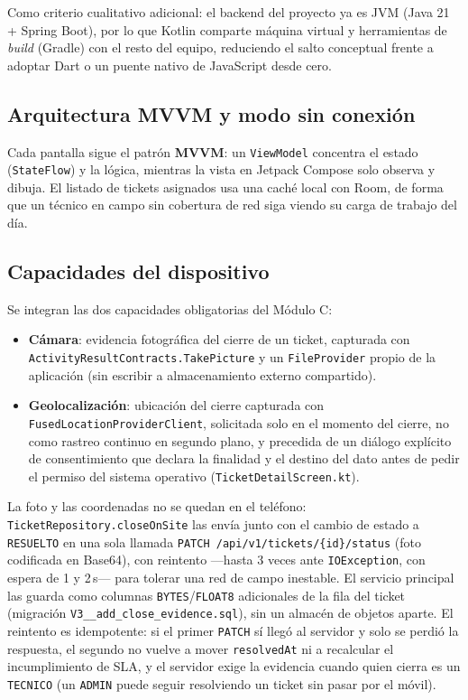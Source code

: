 Como criterio cualitativo adicional: el backend del proyecto ya es JVM (Java 21 + Spring Boot),
por lo que Kotlin comparte máquina virtual y herramientas de \emph{build} (Gradle) con el resto
del equipo, reduciendo el salto conceptual frente a adoptar Dart o un puente nativo de JavaScript
desde cero.

\subsection{Arquitectura MVVM y modo sin conexión}

Cada pantalla sigue el patrón \textbf{MVVM}: un \texttt{ViewModel} concentra el estado
(\texttt{StateFlow}) y la lógica, mientras la vista en Jetpack Compose solo observa y dibuja. El
listado de tickets asignados usa una caché local con Room, de forma que un técnico en campo sin
cobertura de red siga viendo su carga de trabajo del día.

\subsection{Capacidades del dispositivo}

Se integran las dos capacidades obligatorias del Módulo C:

\begin{itemize}[nosep]
  \item \textbf{Cámara}: evidencia fotográfica del cierre de un ticket, capturada con
        \texttt{ActivityResultContracts.TakePicture} y un \texttt{FileProvider} propio de la
        aplicación (sin escribir a almacenamiento externo compartido).
  \item \textbf{Geolocalización}: ubicación del cierre capturada con
        \texttt{FusedLocationProviderClient}, solicitada solo en el momento del cierre, no como
        rastreo continuo en segundo plano, y precedida de un diálogo explícito de consentimiento
        que declara la finalidad y el destino del dato antes de pedir el permiso del sistema
        operativo (\texttt{TicketDetailScreen.kt}).
\end{itemize}

La foto y las coordenadas no se quedan en el teléfono: \texttt{TicketRepository.closeOnSite}
las envía junto con el cambio de estado a \texttt{RESUELTO} en una sola llamada
\texttt{PATCH /api/v1/tickets/\{id\}/status} (foto codificada en Base64), con reintento —hasta 3
veces ante \texttt{IOException}, con espera de 1 y 2\,s— para tolerar una red de campo
inestable. El servicio principal las guarda como columnas \texttt{BYTES}/\texttt{FLOAT8}
adicionales de la fila del ticket (migración \texttt{V3\_\_add\_close\_evidence.sql}), sin un
almacén de objetos aparte. El reintento es idempotente: si el primer \texttt{PATCH} sí llegó al
servidor y solo se perdió la respuesta, el segundo no vuelve a mover \texttt{resolvedAt} ni a
recalcular el incumplimiento de SLA, y el servidor exige la evidencia cuando quien cierra es un
\texttt{TECNICO} (un \texttt{ADMIN} puede seguir resolviendo un ticket sin pasar por el móvil).

